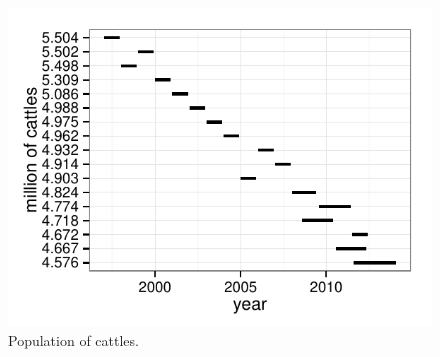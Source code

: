 \documentclass{article}\usepackage[]{graphicx}\usepackage[]{color}
\newenvironment{knitrout}{}{} %
\begin{document}
\begin{knitrout}
\begin{figure}[H]
\includegraphics[width=\textwidth]{figure/r} \caption[Population of cattles]{Population of cattles.\label{fig:r}}
\end{figure}


\end{knitrout}
\end{document}
